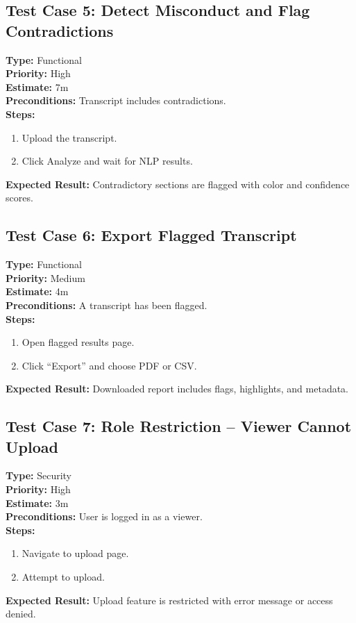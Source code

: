\documentclass[12pt]{article}
\begin{document}
\subsection*{Test Case 5: Detect Misconduct and Flag Contradictions}
\textbf{Type:} Functional \\
\textbf{Priority:} High \\
\textbf{Estimate:} 7m \\
\textbf{Preconditions:} Transcript includes contradictions. \\
\textbf{Steps:}
\begin{enumerate}[label=\arabic*.]
\item Upload the transcript.
\item Click Analyze and wait for NLP results.
\end{enumerate}
\textbf{Expected Result:} Contradictory sections are flagged with color and confidence scores.

\subsection*{Test Case 6: Export Flagged Transcript}
\textbf{Type:} Functional \\
\textbf{Priority:} Medium \\
\textbf{Estimate:} 4m \\
\textbf{Preconditions:} A transcript has been flagged. \\
\textbf{Steps:}
\begin{enumerate}[label=\arabic*.]
\item Open flagged results page.
\item Click “Export” and choose PDF or CSV.
\end{enumerate}
\textbf{Expected Result:} Downloaded report includes flags, highlights, and metadata.

\subsection*{Test Case 7: Role Restriction – Viewer Cannot Upload}
\textbf{Type:} Security \\
\textbf{Priority:} High \\
\textbf{Estimate:} 3m \\
\textbf{Preconditions:} User is logged in as a viewer. \\
\textbf{Steps:}
\begin{enumerate}[label=\arabic*.]
\item Navigate to upload page.
\item Attempt to upload.
\end{enumerate}
\textbf{Expected Result:} Upload feature is restricted with error message or access denied.
\end{document}

